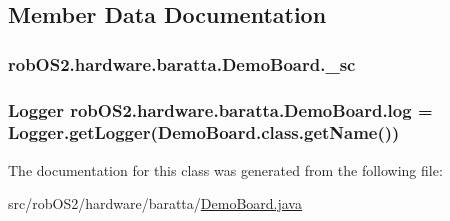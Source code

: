 \subsection{Member Data Documentation}
\hypertarget{classrob_o_s2_1_1hardware_1_1baratta_1_1_demo_board_ae24ad624c42e0ab252e19ac9e6b2aa55}{
\subsubsection[{\_\-sc}]{ {\bf robOS2.hardware.baratta.DemoBoard.\_\-sc}}}
\label{classrob_o_s2_1_1hardware_1_1baratta_1_1_demo_board_ae24ad624c42e0ab252e19ac9e6b2aa55}
\hypertarget{classrob_o_s2_1_1hardware_1_1baratta_1_1_demo_board_a1faa9111e6c6adb19eb51f709532b77d}{
\subsubsection[{log}]{\setlength{\rightskip}{0pt plus 5cm}Logger {\bf robOS2.hardware.baratta.DemoBoard.log} = Logger.getLogger(DemoBoard.class.getName())}}
\label{classrob_o_s2_1_1hardware_1_1baratta_1_1_demo_board_a1faa9111e6c6adb19eb51f709532b77d}


The documentation for this class was generated from the following file:\begin{DoxyCompactItemize}
\item 
src/robOS2/hardware/baratta/\hyperlink{_demo_board_8java}{DemoBoard.java}\end{DoxyCompactItemize}
